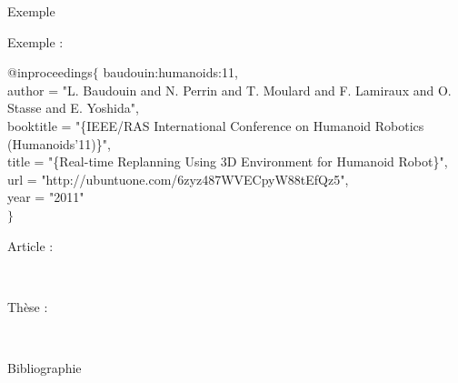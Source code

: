 \documentclass{beamer}
\begin{document}
\begin{frame}{Exemple}

  Exemple :\\
  \vspace{2mm}
  \begin{scriptsize}
    @inproceedings$\lbrace$ baudouin:humanoids:11,\\
    \hspace{5mm} author = "L. Baudouin and N. Perrin and T. Moulard and F. Lamiraux and O. Stasse and E. Yoshida",\\
    \hspace{5mm} booktitle = "\{IEEE/RAS International Conference on Humanoid Robotics (Humanoids'11)\}",\\
    \hspace{5mm} title = "\{Real-time Replanning Using 3D Environment for Humanoid Robot\}",\\
    \hspace{5mm} url = "http://ubuntuone.com/6zyz487WVECpyW88tEfQz5",\\
    \hspace{5mm} year = "2011"\\
    \vspace{-2mm}
    $\rbrace$
  \end{scriptsize}
  \vspace{5mm}

  Article :\\
  \begin{scriptsize}
    \mbox{
      \citeauthor{baudouin:humanoids:11}
      \cite{baudouin:humanoids:11}
    }
  \end{scriptsize}

  Thèse :\\
  \begin{scriptsize}
    \mbox{
      \citeauthor{Courbon09PhD}
      \cite{Courbon09PhD}}
  \end{scriptsize}
  \vspace{5mm}

\end{frame}

\begin{frame}{Bibliographie}
  \printbibliography[heading=none]
\end{frame}
\end{document}
